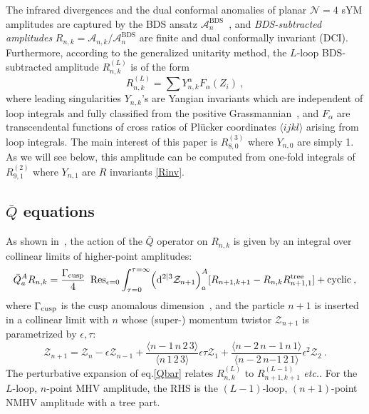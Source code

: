 \documentclass[a4paper,12pt]{article}
\begin{document}
The infrared divergences and the dual conformal anomalies of planar $\mathcal{N}=4$ sYM amplitudes are captured by the BDS ansatz $\mathcal{A}_{n}^{\text{BDS}}$~\cite{Drummond:2007au}, and \emph{BDS-subtracted amplitudes} $R_{n,k}=\mathcal{A}_{n,k}/\mathcal{A}_{n}^{\text{BDS}}$ are finite and dual conformally invariant (DCI). Furthermore, according to the generalized unitarity method, the $L$-loop BDS-subtracted amplitude $R_{n,k}^{(L)}$ is of the form
\begin{equation}
    R_{n,k}^{(L)}= \sum Y_{n,k}^{\alpha}F_{\alpha}(Z_{i}) \:,
\end{equation}
where leading singularities $Y_{n,k}$'s are Yangian invariants which are independent of loop integrals and fully classified from the positive Grassmannian~\cite{Drummond:2010uq,ArkaniHamed:2009vw,ArkaniHamed:2012nw}, and $F_{\alpha}$ are transcendental functions of cross ratios of Pl\"{u}cker coordinates $\langle ijkl\rangle$ arising from loop integrals. The main interest of this paper is $R_{8,0}^{(3)}$ where $Y_{n,0}$ are simply 1. As we will see below, this amplitude can be computed from one-fold integrals of $R_{9,1}^{(2)}$ where $Y_{n,1}$ are $R$ invariants \eqref{Rinv}.


\subsection{$\bar Q$ equations} 

As shown in~\cite{CaronHuot:2011kk}, the action of the $\bar{Q}$ operator on $R_{n,k}$ is given by an integral over collinear limits of higher-point amplitudes:
\begin{align}
\bar{Q}_{a}^{A} R_{n,k} = \frac{\Gamma_{\rm cusp}}{4}~\operatorname{Res}_{\epsilon=0}\int_{\tau=0}^{\tau=\infty}\Bigl(\mathrm{d}^{2\vert 3}\mathcal{Z}_{n+1}\Bigr)_{a}^{A} 
[ R_{n+1,k+1}
-R_{n,k}R_{n+1,1}^{\text{tree}} ]+ \text{cyclic}  \label{Qbar} \:, 
\end{align}
where $\Gamma_{\rm cusp}$ is the cusp anomalous dimension~\cite{Beisert:2006ez}, and the particle $n{+}1$ is inserted in a collinear limit with $n$ whose (super-) momentum twistor $\mathcal{Z}_{n+1}$ is parametrized by $\epsilon, \tau$:
\begin{equation}
    \mathcal{Z}_{n+1}= \mathcal{Z}_{n}- \epsilon \mathcal{Z}_{n-1} + \frac{\langle n{-}1\,n\,2\,3\rangle}{\langle n\,1\,2\,3\rangle} \epsilon \tau \mathcal{Z}_{1} + \frac{\langle n{-}2\,n{-}1\,n\,1\rangle}{\langle n{-}2\,n{-1}\,2\,1\rangle}\epsilon^{2} \mathcal{Z}_{2} \:.
    \label{colpara}
\end{equation}
The perturbative expansion of eq.\eqref{Qbar} relates $R_{n,k}^{(L)}$ to $ R_{n+1,k+1}^{(L-1)}$ {\it etc.}. 
For the $L$-loop, $n$-point MHV amplitude, the RHS is the $(L-1)$-loop, $(n+1)$-point NMHV amplitude with a tree part. 
\end{document}
